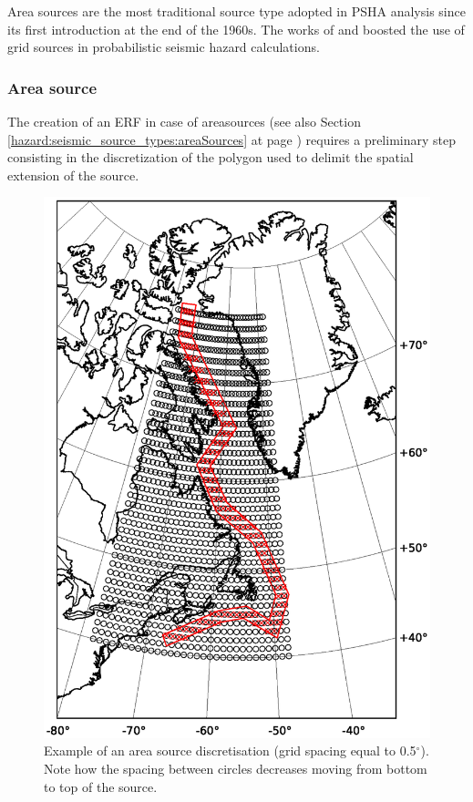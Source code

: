 Area sources are the most traditional source type adopted in PSHA 
analysis since its first introduction at the end of the 1960s. 
%
The works of \cite{frankel1995} and \cite{frankel1997} boosted the 
use of grid sources in probabilistic seismic hazard calculations. 
%
\subsubsection{Area source}
%
The creation of an ERF in case of \glspl{areasource} (see also Section 
\ref{hazard:seismic_source_types:areaSources} at page 
\pageref{hazard:seismic_source_types:areaSources}) requires a 
preliminary step consisting in the discretization of the polygon 
used to delimit the spatial extension of the source. 
%
\begin{figure}[!ht]
\centering
\includegraphics[width=18cm]{./Figures/Part_Hazard/area_source_discretization.eps}
\caption{Example of an area source discretisation (grid spacing equal 
to 0.5$^\circ$). Note how the spacing between circles decreases moving from 
bottom to top of the source.}
\label{fig:area_source_discret}
\end{figure}
